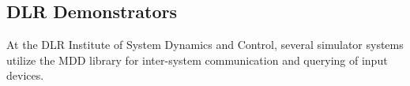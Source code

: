 \documentclass{resources/modelica}
\newcommand{\modelica}[1]{\lstinline[language=modelica]|#1|}
\newcommand{\BTHI}[1]{}
\begin{document}


\subsection{DLR Demonstrators}
\BTHI{Tobias}

At the DLR Institute of System Dynamics and Control, several simulator systems
utilize the MDD library for inter-system
communication and querying of input devices.
\end{document}
